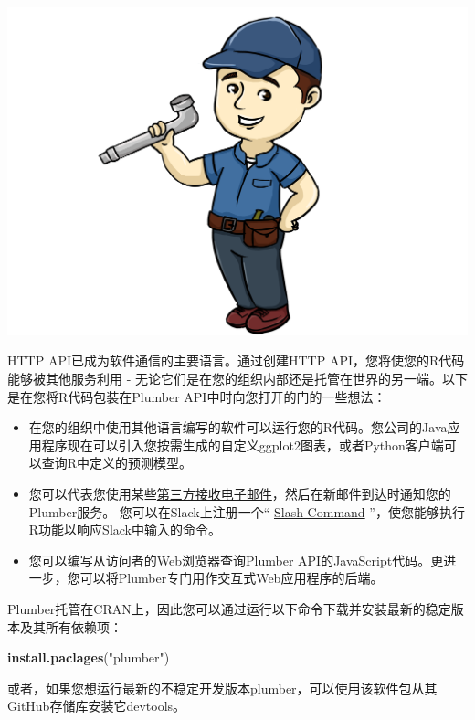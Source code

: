 \documentclass[]{book}
\newenvironment{Shaded}{\begin{snugshade}}{\end{snugshade}}
\newcommand{\KeywordTok}[1]{\textcolor[rgb]{0.13,0.29,0.53}{\textbf{#1}}}
\newcommand{\StringTok}[1]{\textcolor[rgb]{0.31,0.60,0.02}{#1}}
\newcommand{\NormalTok}[1]{#1}
\begin{document}
\includegraphics{pic/plumber/p2.png}

HTTP API已成为软件通信的主要语言。通过创建HTTP
API，您将使您的R代码能够被其他服务利用 -
无论它们是在您的组织内部还是托管在世界的另一端。以下是在您将R代码包装在Plumber
API中时向您打开的门的一些想法：

\begin{itemize}
\item
  在您的组织中使用其他语言编写的软件可以运行您的R代码。您公司的Java应用程序现在可以引入您按需生成的自定义ggplot2图表，或者Python客户端可以查询R中定义的预测模型。
\item
  您可以代表您使用某些\href{https://www.mailgun.com/}{第三方接收电子邮件}，然后在新邮件到达时通知您的Plumber服务。
  您可以在Slack上注册一个``
  \href{https://api.slack.com/slash-commands}{Slash Command}
  ''，使您能够执行R功能以响应Slack中输入的命令。
\item
  您可以编写从访问者的Web浏览器查询Plumber
  API的JavaScript代码。更进一步，您可以将Plumber专门用作交互式Web应用程序的后端。
\end{itemize}

Plumber托管在CRAN上，因此您可以通过运行以下命令下载并安装最新的稳定版本及其所有依赖项：

\begin{Shaded}
\begin{Highlighting}[]
\KeywordTok{install.paclages}\NormalTok{(}\StringTok{"plumber"}\NormalTok{)}
\end{Highlighting}
\end{Shaded}

或者，如果您想运行最新的不稳定开发版本plumber，可以使用该软件包从其GitHub存储库安装它devtools。
\end{document}
